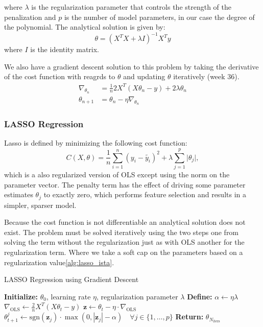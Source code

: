 \documentclass[amssymb,twocolumn,aps]{revtex4}
\begin{document}
where $\lambda$ is the regularization parameter that controls the strength of the penalization and $p$ is the number of model parameters, in our case the degree of the polynomial.
The analytical solution is given by:
\begin{equation}
\theta = (X^TX + \lambda I)^{-1}X^Ty
\end{equation}
where $I$ is the identity matrix.

We also have a gradient descent solution to this problem by taking the derivative of the cost function with reagrds to $\theta$ and updating $\theta$ iteratively \cite{compfys}(week 36).
\begin{align}
\nabla_{\theta_n} &= \frac{1}{n}2X^T(X\theta_n - y) + 2\lambda \theta_n \\
\theta_{n+1} &= \theta_n - \eta \nabla_{\theta_n}
\end{align}

\subsubsection{LASSO Regression}
Lasso is defined by minimizing the following cost function:
$$
C(X,\theta)=\frac{1}{n}\sum^n_{i=1}(y_i- \tilde{y_i})^2+\lambda \sum_{j=1}^p\vert \theta_j\vert
,$$
which is a also regularized version of OLS except using the norm on the parameter vector.
The penalty term has the effect of driving some parameter estimates $\theta_j$ to exactly zero, which performs feature selection and results in a simpler, sparser model.

Because the cost function is not differentiable an analytical solution does not exist.
The problem must be solved iteratively using the two steps one from solving the term without the regularization just as with OLS another for the regularization term.
Where we take a soft cap on the parameters based on a regularization value\ref{alg:lasso_ista}.

\begin{algorithm}
\caption{LASSO Regression using Gradient Descent }
\label{alg:lasso_ista}
\begin{algorithmic}[1]
\State \textbf{Initialize:} $\theta_0$, learning rate $\eta$, regularization parameter $\lambda$
\State \textbf{Define:} $\alpha \leftarrow \eta \lambda$
    \State $\nabla_{\text{OLS}} \leftarrow \frac{2}{n}X^T(X\theta_t - y)$
    \State $\mathbf{z} \leftarrow \theta_t - \eta \cdot \nabla_{\text{OLS}}$
    \State $\theta_{t+1}^j \leftarrow \text{sgn}(\mathbf{z}_j) \cdot \max(0, |\mathbf{z}_j| - \alpha) \quad \forall j \in \{1, \dots, p\}$
\EndFor
\State \textbf{Return:} $\theta_{N_{\text{iters}}}$
\end{algorithmic}
\end{algorithm}
\end{document}
